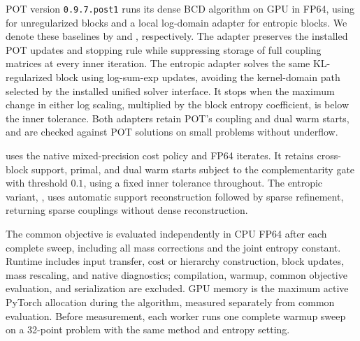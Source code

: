 POT version \texttt{0.9.7.post1} runs its dense BCD algorithm on GPU in FP64, using \mm for unregularized blocks and a local log-domain \sinkhorn adapter for entropic blocks.
We denote these baselines by \bcdmm and \bcdsinkhorn, respectively.
The \mm adapter preserves the installed POT updates and stopping rule while suppressing storage of full coupling matrices at every inner iteration.
The entropic adapter solves the same KL-regularized block using log-sum-exp updates, avoiding the kernel-domain path selected by the installed unified solver interface.
It stops when the maximum change in either log scaling, multiplied by the block entropy coefficient, is below the inner tolerance.
Both adapters retain POT's coupling and dual warm starts, and are checked against POT solutions on small problems without underflow.

\oursufgw uses the native mixed-precision cost policy and FP64 \subsolver iterates.
It retains cross-block support, primal, and dual warm starts subject to the complementarity gate with threshold $0.1$, using a fixed inner tolerance throughout.
The entropic variant, \ourssinkhornufgw, uses automatic support reconstruction followed by sparse \sinkhorn refinement, returning sparse couplings without dense reconstruction.

The common objective is evaluated independently in CPU FP64 after each complete sweep, including all mass corrections and the joint entropy constant.
Runtime includes input transfer, cost or hierarchy construction, block updates, mass rescaling, and native diagnostics; compilation, warmup, common objective evaluation, and serialization are excluded.
GPU memory is the maximum active PyTorch allocation during the algorithm, measured separately from common evaluation.
Before measurement, each worker runs one complete warmup sweep on a 32-point problem with the same method and entropy setting.
